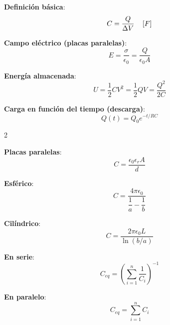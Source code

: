 \documentclass{article}
\begin{document}
                            
                            \begin{itemform}
                            \item \textbf{Definición básica}:
                              $$ C = \dfrac{Q}{\Delta V} \quad \left[F \right] $$

                            \item \textbf{Campo eléctrico (placas paralelas)}:
                              $$ E = \dfrac{\sigma}{\epsilon_0} = \dfrac{Q}{\epsilon_0 A} $$

                            \item \textbf{Energía almacenada}:
                              $$ U = \dfrac{1}{2}CV^2 = \dfrac{1}{2}QV = \dfrac{Q^2}{2C} $$

                            \item \textbf{Carga en función del tiempo (descarga)}:
                              $$ Q(t) = Q_0 e^{-t/RC} $$
                            \end{itemform}
                            \begin{multicols}{2}

                              \begin{itemform}

                              \item \textbf{Placas paralelas}:
                                $$ C = \dfrac{\epsilon_0 \epsilon_r A}{d} $$

                              \item \textbf{Esférico}:
                                $$ C = \dfrac{4\pi\epsilon_0}{\dfrac{1}{a} - \dfrac{1}{b}} $$

                              \item \textbf{Cilíndrico}:
                                $$ C = \dfrac{2\pi\epsilon_0 L}{\ln(b/a)} $$

                              \item \textbf{En serie}:
                                $$ C_{eq} = \left(\sum_{i=1}^n \dfrac{1}{C_i}\right)^{-1} $$

                              \item \textbf{En paralelo}:
                                $$ C_{eq} = \sum_{i=1}^n C_i $$

                              \end{itemform}
                              
                          \end{multicols}
              
\end{document}
